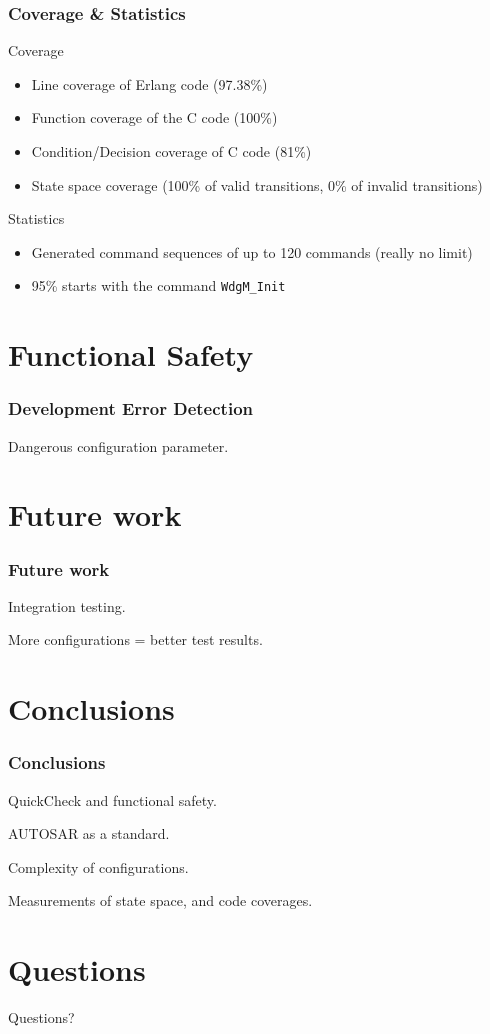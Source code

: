 \documentclass{beamer}
\begin{document}
\begin{frame}[fragile]
  \frametitle{Coverage \& Statistics}
  \begin{block}{Coverage}
    \begin{itemize}
      \item Line coverage of Erlang code (97.38\%)
      \item Function coverage of the C code (100\%)
      \item Condition/Decision coverage of C code (81\%)
      \item State space coverage (100\% of valid transitions, 0\% of invalid transitions)
    \end{itemize}
  \end{block}
  \begin{block}{Statistics}
    \begin{itemize}
      \item Generated command sequences of up to 120 commands (really no limit)
      \item 95\% starts with the command \verb!WdgM_Init!
    \end{itemize}
  \end{block}
\end{frame}

\section{Functional Safety}
\begin{frame}[fragile]
  \frametitle{Development Error Detection}
  Dangerous configuration parameter.
\end{frame}

\section{Future work}
\begin{frame}[fragile]
  \frametitle{Future work}
  Integration testing.

  More configurations = better test results.
\end{frame}

\section{Conclusions}
\begin{frame}
  \frametitle{Conclusions}
  QuickCheck and functional safety.

  AUTOSAR as a standard.

  Complexity of configurations.

  Measurements of state space, and code coverages.
\end{frame}

\section{Questions}
\begin{frame}
  \Huge{\centerline{Questions?}}
\end{frame}
\end{document}
